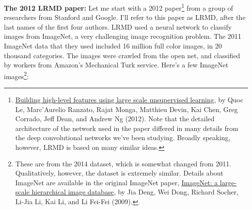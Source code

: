 \documentclass[a4paper,twoside,10pt]{book}
\begin{document}
\textbf{The 2012 LRMD paper:} Let me start with a 2012 paper\footnote{\href{http://research.google.com/pubs/pub38115.html}{Building high-level features using large scale unsupervised learning}, by Quoc Le, Marc'Aurelio Ranzato, Rajat Monga, Matthieu Devin, Kai Chen, Greg Corrado, Jeff Dean, and Andrew Ng (2012). Note that the detailed architecture of the network used in the paper differed in many details from the deep convolutional networks we've been studying. Broadly speaking, however, LRMD is based on many similar ideas.} from a group of researchers from Stanford and Google. I'll refer to this paper as LRMD, after the last names of the first four authors. LRMD used a neural network to classify images from ImageNet, a very challenging image recognition problem. The 2011 ImageNet data that they used included 16 million full color images, in 20 thousand categories. The images were crawled from the open net, and classified by workers from Amazon's Mechanical Turk service. Here's a few ImageNet images\footnote{These are from the 2014 dataset, which is somewhat changed from 2011. Qualitatively, however, the dataset is extremely similar. Details about ImageNet are available in the original ImageNet paper, \href{http://www.image-net.org/papers/imagenet_cvpr09.pdf}{ImageNet: a large-scale hierarchical image database}, by Jia Deng, Wei Dong, Richard Socher, Li-Jia Li, Kai Li, and Li Fei-Fei (2009).}:
\begin{center}
\end{center}
\end{document}
